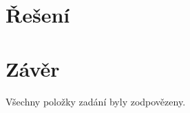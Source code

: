 \documentclass{article}
\begin{document}
\section{Řešení}









\section{Závěr}
Všechny položky zadání byly zodpovězeny.
\end{document}
